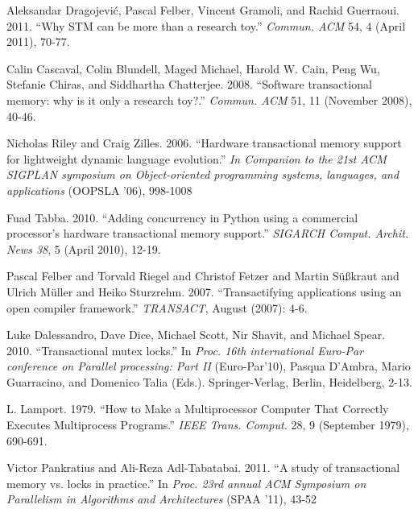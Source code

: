 \documentclass{sigplanconf}
\begin{document}
\begin{thebibliography}{}
 Aleksandar Dragojević, Pascal Felber, Vincent
  Gramoli, and Rachid Guerraoui. 2011. ``Why STM can be more than a
  research toy.'' \emph{Commun. ACM} 54, 4 (April 2011), 70-77.

  Calin Cascaval, Colin Blundell, Maged Michael, Harold W. Cain, Peng
  Wu, Stefanie Chiras, and Siddhartha Chatterjee. 2008. ``Software
  transactional memory: why is it only a research
  toy?.'' \emph{Commun. ACM} 51, 11 (November 2008), 40-46.

  Nicholas Riley and Craig Zilles. 2006. ``Hardware transactional memory
  support for lightweight dynamic language evolution.'' \emph{In
    Companion to the 21st ACM SIGPLAN symposium on Object-oriented
    programming systems, languages, and applications} (OOPSLA
  '06), 998-1008

  Fuad Tabba. 2010. ``Adding concurrency in Python using a commercial
  processor's hardware transactional memory support.'' \emph{SIGARCH
  Comput. Archit. News 38}, 5 (April 2010), 12-19.

  Pascal Felber and Torvald Riegel and Christof Fetzer and Martin
  Süßkraut and Ulrich Müller and Heiko Sturzrehm. 2007. ``Transactifying
  applications using an open compiler framework.'' \emph{TRANSACT}, August
  (2007): 4-6.


  Luke Dalessandro, Dave Dice, Michael Scott, Nir Shavit, and Michael
  Spear. 2010. ``Transactional mutex locks.'' In \emph{Proc.
    16th international Euro-Par conference on Parallel processing: Part
    II} (Euro-Par'10), Pasqua D'Ambra, Mario Guarracino, and Domenico
  Talia (Eds.). Springer-Verlag, Berlin, Heidelberg, 2-13.

  L. Lamport. 1979. ``How to Make a Multiprocessor Computer That Correctly
  Executes Multiprocess Programs.'' \emph{IEEE Trans. Comput.} 28, 9
  (September 1979), 690-691.

  Victor Pankratius and Ali-Reza Adl-Tabatabai. 2011. ``A study of
  transactional memory vs. locks in practice.'' In \emph{Proc.
     23rd annual ACM Symposium on Parallelism in Algorithms
    and Architectures} (SPAA '11), 43-52


\end{thebibliography}
\end{document}
